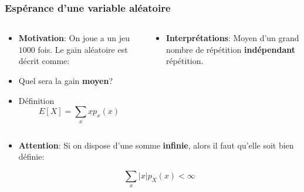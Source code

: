 \documentclass{beamer}
\begin{document}
\begin{frame}[t]
  \frametitle{Espérance d'une variable aléatoire}

  \begin{columns}
    \begin{column}{0.5\textwidth}
      \begin{itemize}
        \scriptsize
        \item<1-> \textbf{Motivation}: On joue a un jeu $1000$ fois. Le gain
          aléatoire est décrit comme:
        \item<3-> Quel sera la gain \alert{\textbf{moyen}}?\\[2cm]
        \item<4-> 
          \begin{block}{Définition}
            $$
            E[X] = \sum_x x p_x(x)
            $$
          \end{block}
      \end{itemize}
    \end{column}
    \begin{column}{0.5\textwidth}
      
    {
      \begin{itemize}
        \scriptsize
        \item \textbf{Interprétations}: Moyen d'un grand nombre de répétition
          \alert{\textbf{indépendant}}  répétition.
      \end{itemize}
    }
    \end{column}
  \end{columns}

  \pause
  \begin{itemize}
    \scriptsize
    \item \alert{\textbf{Attention}}: Si on dispose d'une somme
      \textbf{infinie}, alors il faut qu'elle soit bien définie:

      $$
      \sum_x \vert x\vert p_X(x) < \infty
      $$
  \end{itemize}
\end{frame}
\end{document}
